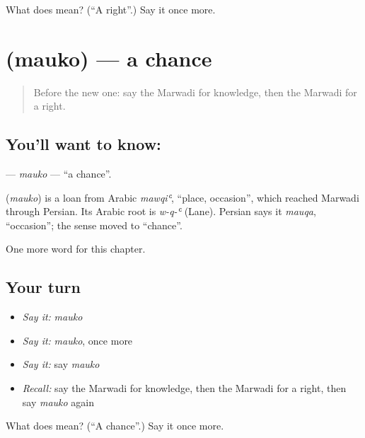 \begin{tcolorbox}[breakable,colback=teal!4,colframe=teal!35!black,title={Before you move on}]
What does  mean? (\textquotedblleft{}A right\textquotedblright{}.) Say it once more.
\end{tcolorbox}
\section[\texorpdfstring{\mw{मौको} (mauko)}{मौको (mauko)}]{ (mauko) — a chance}

\label{lesson:MW-C116-mauko}



\begin{quote}
Before the new one: say the Marwadi for knowledge, then the Marwadi for a right.
\end{quote}

\subsection*{You'll want to know: }
\textbf{} — \emph{mauko} — \textquotedblleft{}a chance\textquotedblright{}.

\begin{cousinweb}
\textbf{} (\emph{mauko}) is a loan from Arabic \emph{mawqiʿ}, \textquotedblleft{}place, occasion\textquotedblright{}, which reached Marwadi through Persian. Its Arabic root is \emph{w-q-ʿ} (Lane). Persian says it \emph{mauqa}, \textquotedblleft{}occasion\textquotedblright{}; the sense moved to \textquotedblleft{}chance\textquotedblright{}.
\end{cousinweb}

\begin{grammarlens}[title={What you've built}]
One more word for this chapter.
\end{grammarlens}

\subsection*{Your turn}
\begin{itemize}
\raggedright
  \item \emph{Say it:} \emph{mauko}
  \item \emph{Say it:} \emph{mauko}, once more
  \item \emph{Say it:} say \emph{mauko}
  \item \emph{Recall:} say the Marwadi for knowledge, then the Marwadi for a right, then say \emph{mauko} again
\end{itemize}

\begin{tcolorbox}[breakable,colback=teal!4,colframe=teal!35!black,title={Before you move on}]
What does  mean? (\textquotedblleft{}A chance\textquotedblright{}.) Say it once more.
\end{tcolorbox}
